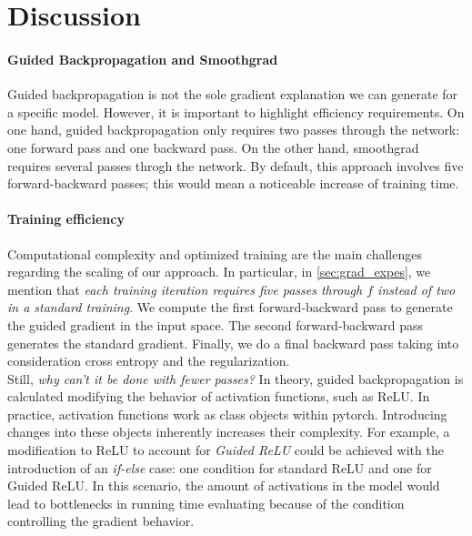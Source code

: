 \section{Discussion}
\label{sec:grad_discussion}
\paragraph{Guided Backpropagation and Smoothgrad} Guided backpropagation is not the sole gradient 
explanation we can generate for a specific model. However, it is important to highlight efficiency 
requirements. On one hand, guided backpropagation only requires two passes through the network: 
one forward pass and one backward pass. On the other hand, smoothgrad requires several passes 
throgh the network. By default, this approach involves five forward-backward passes; this would 
mean a noticeable increase of training time.

\paragraph{Training efficiency} Computational complexity and optimized 
training are the main challenges regarding the scaling of our approach. In particular, 
in \autoref{sec:grad_expes}, we mention that \emph{each training iteration requires five passes 
through $f$ instead of two in a standard training}. We compute the first forward-backward pass 
to generate the guided gradient in the input space. The second forward-backward pass generates the 
standard gradient. Finally, we do a final backward pass taking into consideration cross entropy 
and the regularization.\\

\noindent Still, \emph{why can't it be done with fewer passes?} In theory, 
guided backpropagation is calculated modifying the behavior of activation functions, such as ReLU. 
In practice, activation functions work as class objects within pytorch. Introducing 
changes into these objects inherently increases their complexity. For example, a modification 
to ReLU to account for \emph{Guided ReLU} could be achieved with the introduction of an \emph{if-else} 
case: one condition for standard ReLU and one for Guided ReLU. In this scenario, the amount of 
activations in the model would lead to bottlenecks in running time evaluating because of the 
condition controlling the gradient behavior.\\

